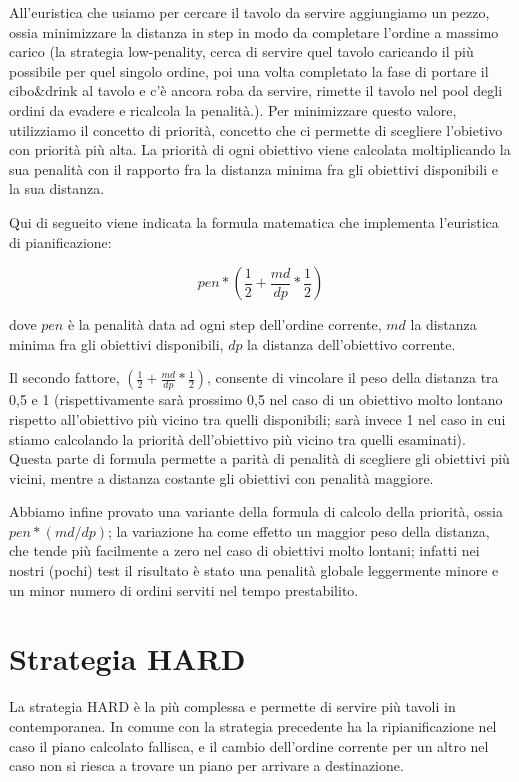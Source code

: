 All'euristica che usiamo per cercare il tavolo da servire aggiungiamo un pezzo, ossia minimizzare la distanza in step in modo da completare l'ordine a massimo carico (la strategia low-penality, cerca di servire quel tavolo caricando il più possibile per quel singolo ordine, poi una volta completato la fase di portare il cibo&drink al tavolo e c'è ancora roba da servire, rimette il tavolo nel pool degli ordini da evadere e ricalcola la penalità.). Per minimizzare questo valore, utilizziamo il concetto di priorità, concetto che ci permette di scegliere l'obietivo con priorità più alta. La priorità di ogni obiettivo viene calcolata moltiplicando la sua penalità con il rapporto fra la distanza minima fra gli obiettivi disponibili e la sua distanza.

Qui di segueito viene indicata la formula matematica che implementa l'euristica di pianificazione:

$$ pen*(\frac{1}{2} + \frac{md}{dp}*\frac{1}{2}) $$

dove $pen$ è la penalità data ad ogni step dell'ordine corrente, $md$ la distanza minima fra gli obiettivi disponibili, $dp$ la distanza dell'obiettivo corrente.

Il secondo fattore, $(\frac{1}{2} + \frac{md}{dp}*\frac{1}{2})$, consente di vincolare il peso della distanza tra 0,5 e 1 (rispettivamente sarà prossimo 0,5 nel caso di un obiettivo molto lontano rispetto all'obiettivo più vicino tra quelli disponibili; sarà invece 1 nel caso in cui stiamo calcolando la priorità dell'obiettivo più vicino tra quelli esaminati). Questa parte di formula permette a parità di penalità di scegliere gli obiettivi più vicini, mentre a distanza costante gli obiettivi con penalità maggiore.

Abbiamo infine provato una variante della formula di calcolo della priorità, ossia $pen*(md/dp)$; la variazione ha come effetto un maggior peso della distanza, che tende più facilmente a zero nel caso di obiettivi molto lontani; infatti nei nostri (pochi) test il risultato è stato una penalità globale leggermente minore e un minor numero di ordini serviti nel tempo prestabilito.

\section{Strategia HARD}
La strategia HARD è la più complessa e permette di servire più tavoli in contemporanea. In comune con la strategia precedente ha la ripianificazione nel caso il piano calcolato fallisca, e il cambio dell'ordine corrente per un altro nel caso non si riesca a trovare un piano per arrivare a destinazione.

